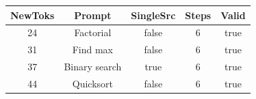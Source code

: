 \begin{table}[h]
\centering
\begin{tabular}{ |c|c|c|c|c| }
\hline
NewToks & Prompt & SingleSrc & Steps & Valid \\
\hline
24 & Factorial & false & 6 & true \\
\hline
31 & Find max & false & 6 & true \\
\hline
37 & Binary search & true & 6 & true \\
\hline
44 & Quicksort & false & 6 & true \\
\hline
\end{tabular}
\end{table}
